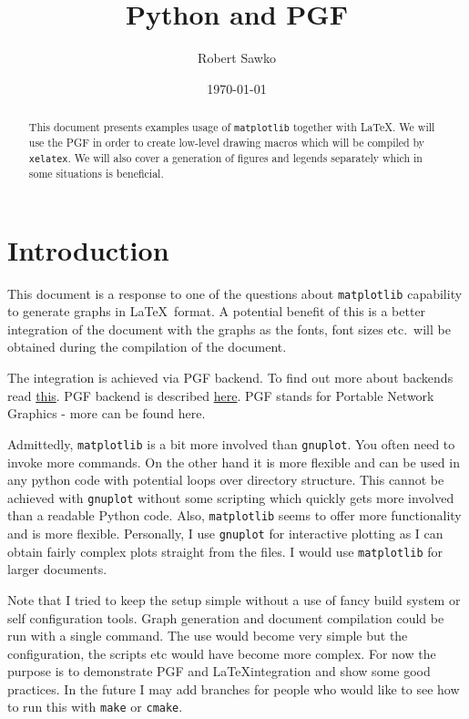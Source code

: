 \documentclass[a4paper,12pt]{article}
\date{\today}
\author{Robert Sawko}
\affil{Department of Engineering Computing, Cranfield University}
\title{Python and PGF}
\begin{document}
\maketitle

\begin{abstract}

  This document presents examples usage of \texttt{matplotlib} together with
  \LaTeX. We will use the PGF in order to create low-level drawing macros which
  will be compiled by \texttt{xelatex}. We will also cover a generation of
  figures and legends separately which in some situations is beneficial.
\end{abstract}

\section{Introduction}
This document is a response to one of the questions about \texttt{matplotlib}
capability to generate graphs in \LaTeX\ format. A potential benefit of this is
a better integration of the document with the graphs as the fonts, font sizes
etc.\ will be obtained during the compilation of the document.

The integration is achieved via PGF backend. To find out more about backends
read \href{http://matplotlib.org/faq/usage_faq.html#what-is-a-backend}{this}.
PGF backend is described \href{http://matplotlib.org/users/pgf.html}{here}. PGF
stands for Portable Network Graphics - more can be found here.

Admittedly, \texttt{matplotlib} is a bit more involved than \texttt{gnuplot}.
You often need to invoke more commands. On the other hand it is more flexible
and can be used in any python code with potential loops over directory
structure. This cannot be achieved with \texttt{gnuplot} without some scripting
which quickly gets more involved than a readable Python code. Also,
\texttt{matplotlib} seems to offer more functionality and is more flexible.
Personally, I use \texttt{gnuplot} for interactive plotting as I can obtain
fairly complex plots straight from the files. I would use \texttt{matplotlib}
for larger documents.

Note that I tried to keep the setup simple without a use of fancy build system
or self configuration tools. Graph generation and document compilation could be
run with a single command. The use would become very simple but the
configuration, the scripts etc would have become more complex. For now the
purpose is to demonstrate PGF and \LaTeX integration and show some good
practices. In the future I may add branches for people who would like to see how
to run this with \texttt{make} or \texttt{cmake}.
\end{document}
